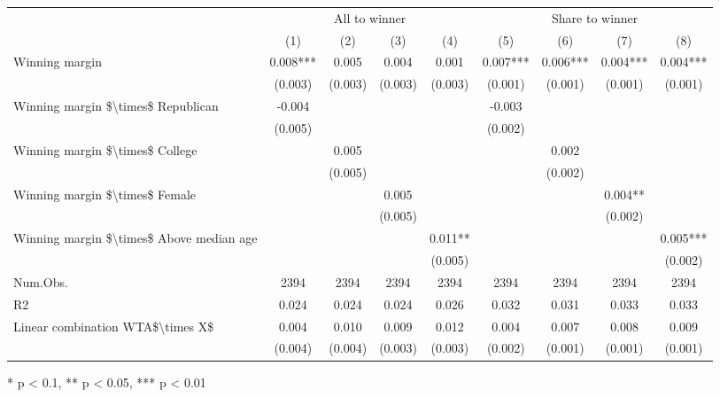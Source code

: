 \begin{table}[t]
\fontsize{12.0pt}{14.4pt}\selectfont
\begin{tabular*}{\linewidth}{@{\extracolsep{\fill}}lcccccccc}
\toprule
 & \multicolumn{4}{c}{All to winner} & \multicolumn{4}{c}{Share to winner} \\ 
\cmidrule(lr){2-5} \cmidrule(lr){6-9}
  & (1) & (2) & (3) & (4) & (5) & (6) & (7) & (8) \\ 
\midrule\addlinespace[2.5pt]
Winning margin & 0.008*** & 0.005 & 0.004 & 0.001 & 0.007*** & 0.006*** & 0.004*** & 0.004*** \\ 
 & (0.003) & (0.003) & (0.003) & (0.003) & (0.001) & (0.001) & (0.001) & (0.001) \\ 
Winning margin \$\textbackslash{}times\$ Republican & -0.004 &  &  &  & -0.003 &  &  &  \\ 
 & (0.005) &  &  &  & (0.002) &  &  &  \\ 
Winning margin \$\textbackslash{}times\$ College &  & 0.005 &  &  &  & 0.002 &  &  \\ 
 &  & (0.005) &  &  &  & (0.002) &  &  \\ 
Winning margin \$\textbackslash{}times\$ Female &  &  & 0.005 &  &  &  & 0.004** &  \\ 
 &  &  & (0.005) &  &  &  & (0.002) &  \\ 
Winning margin \$\textbackslash{}times\$ Above median age &  &  &  & 0.011** &  &  &  & 0.005*** \\ 
{} & {} & {} & {} & {(0.005)} & {} & {} & {} & {(0.002)} \\ 
Num.Obs. & 2394 & 2394 & 2394 & 2394 & 2394 & 2394 & 2394 & 2394 \\ 
R2 & 0.024 & 0.024 & 0.024 & 0.026 & 0.032 & 0.031 & 0.033 & 0.033 \\ 
Linear combination WTA\$\textbackslash{}times X\$ & 0.004 & 0.010 & 0.009 & 0.012 & 0.004 & 0.007 & 0.008 & 0.009 \\ 
 & (0.004) & (0.004) & (0.003) & (0.003) & (0.002) & (0.001) & (0.001) & (0.001) \\ 
\bottomrule
\end{tabular*}
\begin{minipage}{\linewidth}
* p < 0.1, ** p < 0.05, *** p < 0.01\\
\end{minipage}
\end{table}

